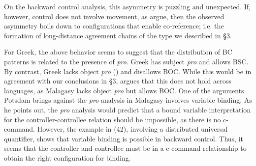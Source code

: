 \documentclass[output=paper]{langsci/langscibook}
\begin{document}
\ea%
    \label{ex:alexiadou:48}
    \z
\z
 
On the backward control analysis, this asymmetry is puzzling and unexpected. If, however, control does not involve movement, as \citet{Tsakali2017} argue, then the observed asymmetry boils down to configurations that enable co-reference; i.e. the formation of long-distance agreement chains of the type we described in §3. 

For Greek, the above behavior seems to suggest that the distribution of BC patterns is related to the presence of \textit{pro}. Greek has subject \textit{pro} and allows BSC. By contrast, Greek lacks object \textit{pro} (\citealt{Giannakidou1997}) and disallows BOC. While this would be in agreement with our conclusions in §3, \citet{Potsdam2006Backward,Potsdam2009} argues that this does not hold across languages, as Malagasy lacks object \textit{pro} but allows BOC. One of the arguments Potsdam brings against the \textit{pro} analysis in Malagasy involves variable binding. As he points out, the \textit{pro} analysis would predict that a bound variable interpretation for the controller-controllee relation should be impossible, as there is no c-command. However, the example in (42), involving a distributed universal quantifier, shows that variable binding is possible in backward control. Thus, it seems that the controller and controllee must be in a c-command relationship to obtain the right configuration for binding. 
\end{document}
